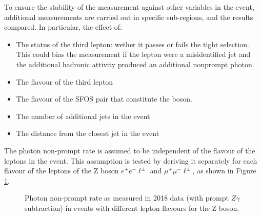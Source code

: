 To ensure the stability of the measurement against other variables in the event,
additional measurements are carried out in specific sub-regions, and the results compared.
In particular, the effect of:
\begin{itemize}
\item The status of the third lepton: wether it passes or fails the tight selection.
  This could bias the measurement if the lepton were a misidentified jet and the additional hadronic attivity produced an additional nonprompt photon.
\item The flavour of the third lepton
\item The flavour of the SFOS pair that constitute the \PZ boson.
\item The number of additional jets in the event
\item The distance from the closest jet in the event
\end{itemize}


The photon non-prompt rate is assumed to be independent of the flavour of the leptons in the event.
This assumption is tested by deriving it separately for each flavour of the leptons of the Z boson $e^+ e^- \ell^\pm$ and $\mu^+ \mu^- \ell^\pm$, as shown in Figure \ref{fig:phFR_2e2m}.

\begin{figure}
\caption{Photon non-prompt rate as measured in 2018 data (with prompt $Z\gamma$ subtraction) in events with different lepton flavours for the Z boson.}
\label{fig:phFR_2e2m}
\end{figure}

